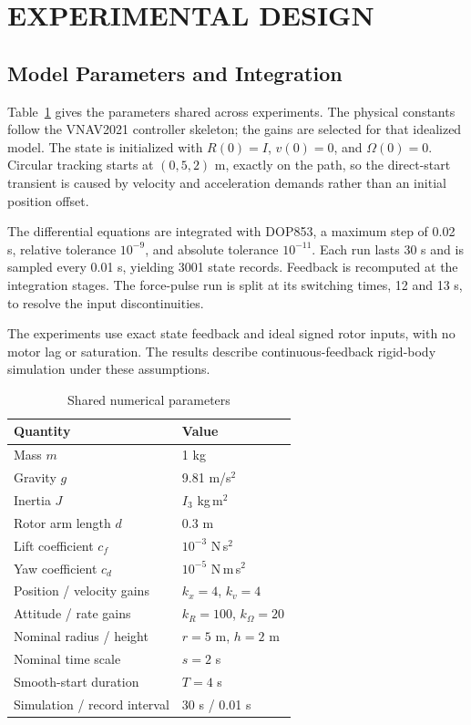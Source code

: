 \documentclass[letterpaper,10pt,conference]{ieeeconf}
\newcommand{\tablehead}{}
\begin{document}
\section{EXPERIMENTAL DESIGN}
\subsection{Model Parameters and Integration}
Table~\ref{tab:params} gives the parameters shared across experiments. The physical constants follow the VNAV2021 controller skeleton\cite{code}; the gains are selected for that idealized model. The state is initialized with $R(0)=I$, $v(0)=0$, and $\Omega(0)=0$. Circular tracking starts at $(0,5,2)$ m, exactly on the path, so the direct-start transient is caused by velocity and acceleration demands rather than an initial position offset.

The differential equations are integrated with DOP853, a maximum step of 0.02 s, relative tolerance $10^{-9}$, and absolute tolerance $10^{-11}$. Each run lasts 30 s and is sampled every 0.01 s, yielding 3001 state records. Feedback is recomputed at the integration stages. The force-pulse run is split at its switching times, 12 and 13 s, to resolve the input discontinuities.

The experiments use exact state feedback and ideal signed rotor inputs, with no motor lag or saturation. The results describe continuous-feedback rigid-body simulation under these assumptions.

\begin{table}[t]
\caption{Shared numerical parameters}\label{tab:params}\centering\small
\begin{tabular}{@{}ll@{}}\toprule
\tablehead Quantity & Value\\\midrule
Mass $m$ & 1 kg\\
Gravity $g$ & 9.81 m/s$^2$\\
Inertia $J$ & $I_3$ kg\,m$^2$\\
Rotor arm length $d$ & 0.3 m\\
Lift coefficient $c_f$ & $10^{-3}$ N\,s$^2$\\
Yaw coefficient $c_d$ & $10^{-5}$ N\,m\,s$^2$\\
Position / velocity gains & $k_x=4$, $k_v=4$\\
Attitude / rate gains & $k_R=100$, $k_\Omega=20$\\
Nominal radius / height & $r=5$ m, $h=2$ m\\
Nominal time scale & $s=2$ s\\
Smooth-start duration & $T=4$ s\\
Simulation / record interval & 30 s / 0.01 s\\\bottomrule
\end{tabular}
\end{table}
\end{document}
